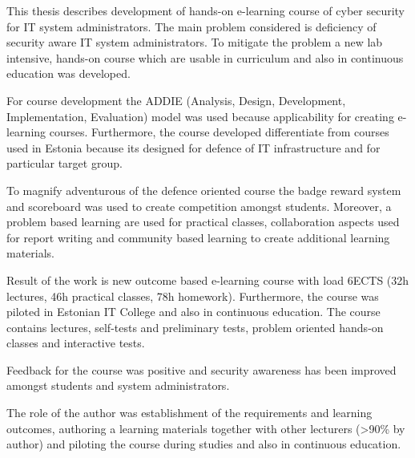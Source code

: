 This thesis describes development of hands-on e-learning course of cyber security for IT system administrators. The main problem considered is deficiency of security aware IT system administrators. To mitigate the problem a new lab intensive, hands-on course which are usable in curriculum and also in continuous education was developed.

For course development the \gls{ADDIE} (Analysis, Design, Development, Implementation, Evaluation) model was used because applicability for creating e-learning courses. Furthermore, the course developed differentiate from courses used in Estonia because its designed for defence of IT infrastructure and for particular target group.

To magnify adventurous of the defence oriented course the badge reward system and scoreboard was used to create competition amongst students. Moreover, a problem based learning are used for practical classes, collaboration aspects used for report writing and community based learning to create additional learning materials.

Result of the work is new outcome based e-learning course with load 6ECTS (32h lectures, 46h practical classes, 78h homework). Furthermore, the course was piloted in Estonian IT College and also in continuous education. The course contains lectures, self-tests and preliminary tests, problem oriented hands-on classes and interactive tests.

Feedback for the course was positive and security awareness has been improved amongst students and system administrators. %

The role of the author was establishment of the requirements and learning outcomes, authoring a learning materials together with other lecturers (>90\% by author) and piloting the course during studies and also in continuous education. 
